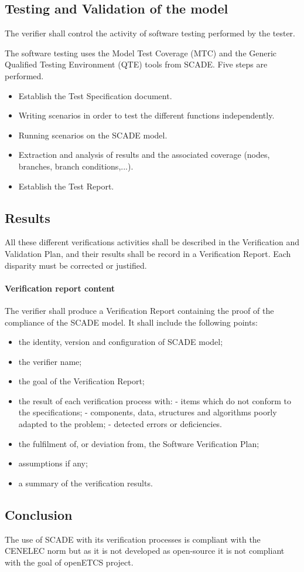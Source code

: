 \subsection{Testing and Validation of the model}

The verifier shall control the activity of software testing performed by the tester.

The software testing uses the Model Test Coverage (MTC) and the Generic Qualified Testing Environment (QTE) tools from SCADE. Five steps are performed.
\begin{itemize}
\item Establish the Test Specification document.
\item Writing scenarios in order to test the different functions independently.
\item Running scenarios on the SCADE model.
\item Extraction and analysis of results and the associated coverage (nodes, branches, branch conditions,...).
\item Establish the Test Report.
\end{itemize}

\subsection{Results}

All these different verifications activities shall be described in the Verification and Validation Plan, and their results shall be record in a Verification Report. Each disparity must be corrected or justified.

\paragraph{Verification report content}

The verifier shall produce a Verification Report containing the proof of the compliance of the SCADE model. It shall include the following points:
\begin{itemize}
\item the identity, version and configuration of SCADE model;
\item the verifier name;
\item the goal of the Verification Report;
\item the result of each verification process with:
\subitem - items which do not conform to the specifications;
\subitem - components, data, structures and algorithms poorly adapted to the problem;
\subitem - detected errors or deficiencies.
\item the fulfilment of, or deviation from, the Software Verification Plan;
\item assumptions if any;
\item a summary of the verification results.
\end{itemize}

\subsection{Conclusion}

The use of SCADE with its verification processes is compliant with the CENELEC norm but as it is not developed as open-source it is not compliant with the goal of openETCS project. 